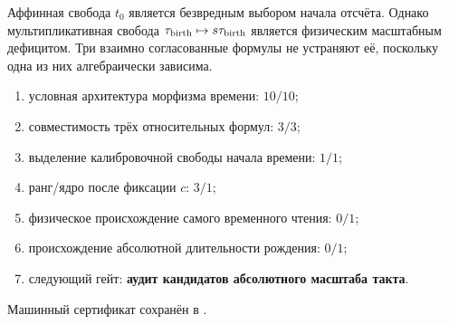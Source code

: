\begin{nogocriterion}
Аффинная свобода $t_0$ является безвредным выбором начала отсчёта. Однако
мультипликативная свобода $\tau_{\rm birth}\mapsto s\tau_{\rm birth}$
является физическим масштабным дефицитом. Три взаимно согласованные формулы
не устраняют её, поскольку одна из них алгебраически зависима.
\end{nogocriterion}

\begin{protocol}\begin{enumerate}
\item условная архитектура морфизма времени: \textbf{$10/10$};
\item совместимость трёх относительных формул: \textbf{$3/3$};
\item выделение калибровочной свободы начала времени: \textbf{$1/1$};
\item ранг/ядро после фиксации $c$: \textbf{$3/1$};
\item физическое происхождение самого временного чтения: \textbf{$0/1$};
\item происхождение абсолютной длительности рождения: \textbf{$0/1$};
\item следующий гейт: \textbf{аудит кандидатов абсолютного масштаба такта}.
\end{enumerate}\end{protocol}

Машинный сертификат сохранён в
.